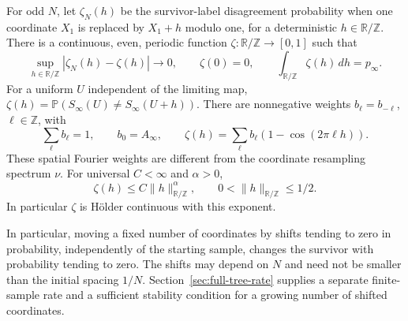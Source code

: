 \documentclass[11pt,letterpaper]{article}
\newcommand{\PP}{\mathbb P}\newcommand{\EE}{\mathbb E}
\newcommand{\T}{\mathbb R/\mathbb Z}\newcommand{\Leb}{\operatorname{Leb}}
\begin{document}
\begin{theorem}
\label{thm:spatial-noise}
For odd $N$, let $\zeta_N(h)$ be the survivor-label disagreement
probability when one coordinate $X_1$ is replaced by $X_1+h$ modulo
one, for a deterministic $h\in\T$. There is a continuous, even,
periodic function $\zeta:\T\to[0,1]$ such that
\begin{equation}\label{eq:spatial-profile}
 \sup_{h\in\T}|\zeta_N(h)-\zeta(h)|\longrightarrow0,\qquad
 \zeta(0)=0,\qquad \int_{\T}\zeta(h)\,dh=p_\infty.
\end{equation}
For a uniform $U$ independent of the limiting map,
$\zeta(h)=\PP(S_\infty(U)\ne S_\infty(U+h))$.
There are nonnegative weights $b_\ell=b_{-\ell}$, $\ell\in\mathbb Z$,
with
\begin{equation}\label{eq:spatial-spectrum}
 \sum_\ell b_\ell=1,\qquad b_0=A_\infty,\qquad
 \zeta(h)=\sum_\ell b_\ell(1-\cos(2\pi\ell h)).
\end{equation}
These spatial Fourier weights are different from the coordinate
resampling spectrum $\nu$.
For universal $C<\infty$ and $\alpha>0$,
\begin{equation}\label{eq:spatial-modulus}
 \zeta(h)\le C\|h\|_{\T}^{\alpha},\qquad
 0<\|h\|_{\T}\le1/2.
\end{equation}
In particular $\zeta$ is H\"older continuous with this exponent.

In particular, moving a fixed number of coordinates by shifts
tending to zero in probability, independently of the starting
sample, changes the survivor with probability tending to zero.
The shifts may depend on $N$ and need not be smaller than the
initial spacing $1/N$. Section~\ref{sec:full-tree-rate} supplies a
separate finite-sample rate and a sufficient stability condition for
a growing number of shifted coordinates.
\end{theorem}
\end{document}

